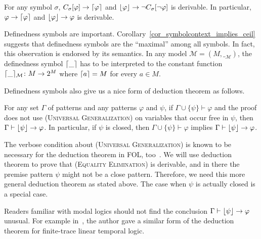 \documentclass[acmsmall]{acmart}
\theoremstyle{acmdefinition}
\newcommand{\imp}{\to}
\newcommand{\MM}{\mathcal{M}}
\newcommand{\interp}[1]{\__{#1}}
\newcommand{\interpM}{\interp{\MM}}
\newcommand{\CSub}[1]{C_{#1}}
\newcommand{\Csigma}{\CSub{\sigma}}
\newcommand{\prule}[1]{\textsc{(#1)}}
\newcommand{\universalgeneralization}{\prule{Universal Generalization}\xspace}
\newcommand{\equalityelimination}{\prule{Equality Elimination}\xspace}
\DeclarePairedDelimiter{\ceil}{\lceil}{\rceil}
\DeclarePairedDelimiter{\floor}{\lfloor}{\rfloor}
\newcommand{\pset}[1]{2^{#1}}
\begin{document}
\begin{corollary}
\label{cor_symbolcontext_implies_ceil}
For any symbol $\sigma$, 
$\Csigma[\varphi] \imp \ceil{\varphi}$
and 
$\floor{\varphi} \imp \neg \Csigma[ \neg \varphi] $
is derivable.
In particular, 
$\varphi \imp \ceil{\varphi}$
and
$\floor {\varphi} \imp \varphi$ is derivable.
\end{corollary}

Definedness symbols are important.
Corollary~\ref{cor_symbolcontext_implies_ceil}
suggests that definedness symbols are the ``maximal'' among all symbols.
In fact, this observation is endorsed by its semantics.
In any model $\MM = (M, \interpM)$, 
the definedness symbol $\ceil{\_}$
has to be interpreted to the constant function
$\ceil{\_}_\MM \colon M \to \pset{M}$
where $\ceil{a} = M$ for every $a \in M$.

Definedness symbols also give us a nice form of deduction theorem as follows.

\begin{theorem}
\label{thm_deduction_theorem}
	For any set $\Gamma$ of patterns and any patterns $\varphi$ and $\psi$,
	if $\Gamma \cup \{ \psi \} \vdash \varphi$ and the proof does not use
	\universalgeneralization on variables that occur free in $\psi$,
	then $\Gamma \vdash \floor{\psi} \imp \varphi$.
	In particular, if $\psi$ is closed,
	then $\Gamma \cup \{ \psi \} \vdash \varphi$
	implies $\Gamma \vdash \floor{\psi} \imp \varphi$.
\end{theorem}

The verbose condition about \universalgeneralization
is known to be necessary for the deduction theorem in FOL, 
too~\cite{hamilton1988logic}.
We will use deduction theorem to prove that
\equalityelimination is derivable, and in there the premise pattern
$\psi$ might not be a close pattern.
Therefore, we need this more general deduction theorem as stated above.
The case when $\psi$ is actually closed is a special case.

Readers familiar with modal logics should not find the conclusion
$\Gamma \vdash \floor{\psi} \imp \varphi$ unusual.
For example in~\cite{rosu-2016-rv}, the author gave a similar form of
the deduction theorem for finite-trace linear temporal logic.
\end{document}

